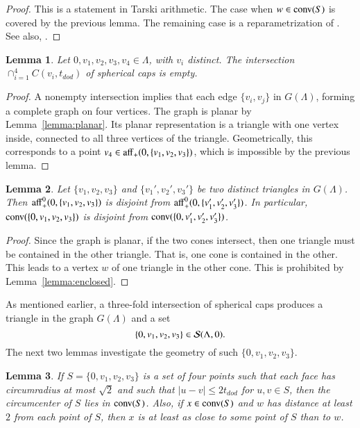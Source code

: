 \documentclass{article} %
\newtheorem{lemma}{Lemma}[subsection]
\begin{document}
\begin{proof} This is a statement in Tarski arithmetic. The case when
$w\in{\operatorname{conv}}(S)$ is covered by the previous lemma. The remaining
case is a reparametrization of \cite[Lemma~4.19]{Hales:2006:DCG}. See
also, \cite[Cor~3.7]{Hales:2002:Dodec}.
\end{proof}

\begin{lemma}\label{lemma:4fold}  
Let $0,v_1,v_2,v_3,v_4\in\Lambda$, with
$v_i$ distinct.  The intersection $\cap_{i=1}^4 C(v_i,t_{dod})$
of spherical caps is empty.
\end{lemma}

\begin{proof}  A nonempty intersection implies that each
edge $\{v_i,v_j\}$ in  $G(\Lambda)$, forming a complete graph
on four vertices.  The graph is planar by Lemma~\ref{lemma:planar}.
Its planar representation is a triangle with one vertex inside,
connected to all three vertices of the triangle.
Geometrically, this corresponds to a point $v_4\in{\operatorname{aff}}_+(0,\{v_1,v_2,v_3\})$, which is impossible by the previous lemma.
\end{proof}

\begin{lemma}  Let $\{v_1,v_2,v_3\}$ and $\{v_1',v_2',v_3'\}$
be two distinct triangles in $G(\Lambda)$.  Then
${\operatorname{aff}}_+^0(0,\{v_1,v_2,v_3\})$ is disjoint from
${\operatorname{aff}}_+^0(0,\{v_1',v_2',v_3'\})$.  In particular,
${\operatorname{conv}}(\{0,v_1,v_2,v_3\})$ is disjoint from
${\operatorname{conv}}(\{0,v_1',v_2',v_3'\})$.
\end{lemma}

\begin{proof} Since the graph is planar, if the two cones
intersect, then one triangle must be contained in the other
triangle.  That is, one cone is contained in the other.  This
leads to a vertex $w$ of one triangle in the other
cone.  This is prohibited
by Lemma~\ref{lemma:enclosed}.
\end{proof}

As mentioned earlier, a three-fold intersection of spherical
caps produces a triangle in the graph $G(\Lambda)$ and a 
set 
$$\{0,v_1,v_2,v_3\}\in {\mathcal S}(\Lambda,0).$$
The next two lemmas investigate the geometry of such $\{0,v_1,v_2,v_3\}$.

\begin{lemma}\label{lemma:Q}
If $S=\{0,v_1,v_2,v_3\}$ is a set of four points such that each
face has circumradius at most $\sqrt2$ and such that
$|u-v|\le 2t_{dod}$ for $u,v\in S$, then
the circumcenter of $S$ lies in ${\operatorname{conv}}(S)$.  Also, if $x
\in {\operatorname{conv}}(S)$ and $w$ has distance at least $2$ from each
point of $S$, then $x$ is at least as close to some point of $S$ than to
$w$.
\end{lemma}
\end{document}
